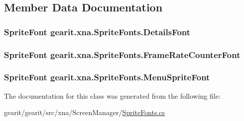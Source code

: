 \subsection{Member Data Documentation}
\hypertarget{classgearit_1_1xna_1_1_sprite_fonts_a8a946557c48ab7813dce57b82101bc9b}{
\subsubsection[{Details\+Font}]{\setlength{\rightskip}{0pt plus 5cm}Sprite\+Font gearit.\+xna.\+Sprite\+Fonts.\+Details\+Font}}\label{classgearit_1_1xna_1_1_sprite_fonts_a8a946557c48ab7813dce57b82101bc9b}
\hypertarget{classgearit_1_1xna_1_1_sprite_fonts_a499145eca0c06c357c441781443294cf}{
\subsubsection[{Frame\+Rate\+Counter\+Font}]{\setlength{\rightskip}{0pt plus 5cm}Sprite\+Font gearit.\+xna.\+Sprite\+Fonts.\+Frame\+Rate\+Counter\+Font}}\label{classgearit_1_1xna_1_1_sprite_fonts_a499145eca0c06c357c441781443294cf}
\hypertarget{classgearit_1_1xna_1_1_sprite_fonts_ae81f4ad067be45638179c8c3623ddfad}{
\subsubsection[{Menu\+Sprite\+Font}]{\setlength{\rightskip}{0pt plus 5cm}Sprite\+Font gearit.\+xna.\+Sprite\+Fonts.\+Menu\+Sprite\+Font}}\label{classgearit_1_1xna_1_1_sprite_fonts_ae81f4ad067be45638179c8c3623ddfad}


The documentation for this class was generated from the following file\+:\begin{DoxyCompactItemize}
\item 
gearit/gearit/src/xna/\+Screen\+Manager/\hyperlink{_sprite_fonts_8cs}{Sprite\+Fonts.\+cs}\end{DoxyCompactItemize}
